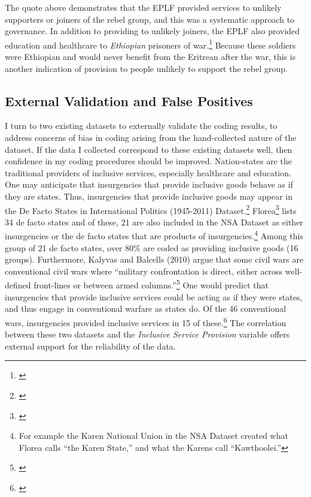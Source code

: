 \documentclass[12pt, letterpaper]{article}
\begin{document}
\begin{enumerate}
\begin{quote}
\end{quote}
The quote above demonstrates that the EPLF provided services to unlikely supporters or joiners of the rebel group, and this was a systematic approach to governance. In addition to providing to unlikely joiners, the EPLF also provided education and healthcare to \textit{Ethiopian} prisoners of war.\footnote{\citealt[91]{wilson1991challenge}} Because these soldiers were Ethiopian and would never benefit from the Eritrean after the war, this is another indication of provision to people unlikely to support the rebel group.
\end{enumerate} 


\subsection*{External Validation and False Positives}
I turn to two existing datasets to externally validate the coding results, to address concerns of bias in coding arising from the hand-collected nature of the dataset. If the data I collected correspond to these existing datasets well, then confidence in my coding procedures should be improved. Nation-states are the traditional providers of inclusive services, especially healthcare and education. One may anticipate that insurgencies that provide inclusive goods behave as if they are states. Thus, insurgencies that provide inclusive goods may appear in the De Facto States in International Politics (1945-2011) Dataset.\footnote{\citealt{florea2014facto}} Florea\footnote{\citealt[5-6]{florea2014facto}} lists 34 de facto states and of these, 21 are also included in the NSA Dataset as either insurgencies or the de facto states that are products of insurgencies.\footnote{For example the Karen National Union in the NSA Dataset created what Florea calls ``the Karen State,'' and what the Karens call ``Kawthoolei.''} Among this group of 21 de facto states, over 80\% are coded as providing inclusive goods (16 groups). Furthermore, Kalyvas and Balcells (2010) argue that some civil wars are conventional civil wars where ``military confrontation is direct, either across well-defined front-lines or between armed columns.''\footnote{\citealt[419]{kalyvas2010international}} One would predict that insurgencies that provide inclusive services could be acting as if they were states, and thus engage in conventional warfare as states do. Of the 46 conventional wars, insurgencies provided inclusive services in 15 of these.\footnote{\citealt{kalyvas2010international}} The correlation between these two datasets and the \textit{Inclusive Service Provision} variable offers external support for the reliability of the data. 
\end{document}
